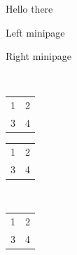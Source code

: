 \documentclass{article}
\begin{document}
\parbox{0px}{\framebox{\strut\hspace{1cm}\strut}}
Hello there
\\
\begin{minipage}{0.5\linewidth}
    Left minipage
\end{minipage}%
\begin{minipage}{0.5\linewidth}
    Right minipage
\end{minipage}\\


\begin{tabular}{p{0.5\linewidth} p{0.5\linewidth}}
    1 & 2\\
    3 & 4
\end{tabular}

{
\renewcommand\arraystretch{1.5}
\begin{tabular}{p{0.5\linewidth} p{0.5\linewidth}}
    1 & 2\\
    3 & 4
\end{tabular}\\
}

\begin{tabular}{p{0.5\linewidth} p{0.5\linewidth}}
    1 & 2\\
    3 & 4
\end{tabular}
\end{document}
